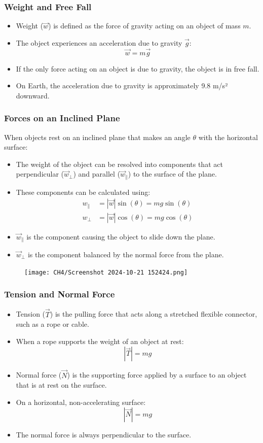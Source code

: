 \documentclass{beamer}
\begin{document}
\begin{frame}
\frametitle{Weight and Free Fall}
\begin{itemize}
    \item Weight ($\vec{w}$) is defined as the force of gravity acting on an object of mass $m$.
    \item The object experiences an acceleration due to gravity $\vec{g}$:
    \[\vec{w}=m\vec{g}\]
    \item If the only force acting on an object is due to gravity, the object is in free fall.
    \item On Earth, the acceleration due to gravity is approximately 9.8 m/s² downward.
\end{itemize}
\end{frame}

\begin{frame}
\frametitle{Forces on an Inclined Plane}
When objects rest on an inclined plane that makes an angle $\theta$ with the horizontal surface:
\begin{itemize}
    \item The weight of the object can be resolved into components that act perpendicular ($\vec{w}_{\perp}$) and parallel ($\vec{w}_{\|}$) to the surface of the plane.
    \item These components can be calculated using:
    \begin{align*}
    w_{\|} &= |\vec{w}| \sin(\theta) = mg \sin(\theta) \\
    w_{\perp} &= |\vec{w}| \cos(\theta) = mg \cos(\theta)
    \end{align*}
    \item $\vec{w}_{\|}$ is the component causing the object to slide down the plane.
    \item $\vec{w}_{\perp}$ is the component balanced by the normal force from the plane.
\end{itemize}
\end{frame}

\begin{frame}
\begin{figure}
    \centering
    \texttt{[image: CH4/Screenshot 2024-10-21 152424.png]}
\end{figure}
\end{frame}
\begin{frame}
\frametitle{Tension and Normal Force}
\begin{itemize}
    \item Tension ($\vec{T}$) is the pulling force that acts along a stretched flexible connector, such as a rope or cable.
    \item When a rope supports the weight of an object at rest:
    \[|\vec{T}| = mg\]
    \item Normal force ($\vec{N}$) is the supporting force applied by a surface to an object that is at rest on the surface.
    \item On a horizontal, non-accelerating surface:
    \[|\vec{N}| = mg\]
    \item The normal force is always perpendicular to the surface.
\end{itemize}
\end{frame}
\end{document}
